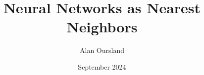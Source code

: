 \documentclass[11pt]{article}
\title{Neural Networks as Nearest Neighbors}
\author{Alan Oursland}
\affil{Independent Researcher}
\date{September 2024}
\begin{document}
\maketitle

\begin{abstract}

\end{abstract}
 











\end{document}
